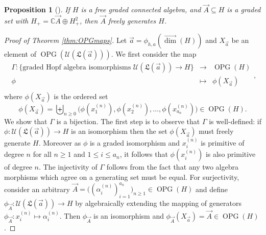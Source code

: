 \documentclass[11pt]{amsart}
\newtheorem{proposition}[theorem]{Proposition}
\theoremstyle{definition}
\numberwithin{equation}{section}
\def\CC{{\mathbb C}}
\newcommand{\vecdim}{\overrightarrow{\dim}}
\newcommand{\OPG}{\operatorname{OPG}}
\begin{document}
\begin{proposition}[{\cite[Proposition 2.2]{F23}}]
\label{prop:indecomposable generators}
If $H$ is a free graded connected algebra, and $\vec{A} \subseteq H$ is a graded set with $H_{+} = \CC \vec{A} \oplus H_{+}^{2}$, then $\vec{A}$ freely generates $H$.
\end{proposition}

\begin{proof}[Proof of Theorem \ref{thm:OPGmaps}]
Let $\vec{a} = \phi_{h,a}(\vecdim(H))$ and $X_{\vec{a}}$ be an element of $\OPG(\mathcal{U}(\mathfrak{L}(\vec{a})))$.
We first consider the map 
\[
\begin{array}{rcl}
\Gamma: \{\text{graded Hopf algebra isomorphisms $\mathcal{U}(\mathfrak{L}(\vec{a})) \to H$}\} &\to& \OPG(H) \\
\phi & \mapsto & \phi(X_{\vec{a}}) \\
\end{array},
\]
where $\phi(X_{\vec{a}})$ is the  ordered set
\[
\phi(X_{\vec{a}}) = \biguplus_{n \ge 0} \big( \phi(x_{1}^{(n)}), \phi(x_{2}^{(n)}), \ldots, \phi(x_{a_{n}}^{(n)}) \big) \in \OPG(H).
\]
We show that $\Gamma$ is a bijection.  The first step is to observe that $\Gamma$
is well-defined: if $\phi: \mathcal{U}(\mathfrak{L}(\vec{a})) \to H$
is an isomorphism then the set $\phi(X_{\vec{a}})$ must freely generate $H$.
Moreover as $\phi$ is a graded isomorphism and $x_{i}^{(n)}$ is primitive
of degree $n$ for all $n \ge 1$ and $1 \le i \le a_{n}$, it follows that
$\phi(x_{i}^{(n)})$ is also primitive of degree $n$.
The injectivity of $\Gamma$ follows from the fact that any two algebra
morphisms which agree on a generating set must be equal.
For surjectivity, consider an arbitrary
$\vec{A} = \big((\alpha_{i}^{(n)})_{i=1}^{a_{n}}\big)_{n \ge 1} \in \OPG(H)$
and define $\phi_{\vec{A}}:\mathcal{U}(\mathfrak{L}(\vec{a})) \to H$ by
algebraically extending the mapping of generators $\phi_{\vec{A}}: x_{i}^{(n)} \mapsto \alpha_i^{(n)}$.
Then $\phi_{\vec{A}}$ is an isomorphism and $\phi_{\vec{A}}(X_{\vec{a}}) = \vec{A} \in \OPG(H)$.


\end{proof}
\end{document}
